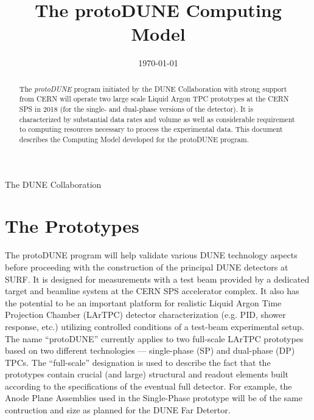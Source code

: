 \documentclass[12pt]{article}
\newcommand{\pd}{protoDUNE\xspace}
\begin{document}

\title{The \pd Computing Model}

\date{\today}

\maketitle

\centerline{The DUNE Collaboration}



\vspace{2cm}

\begin{abstract}

\noindent  The \textit{\pd} program initiated by the DUNE Collaboration with strong support from CERN
will operate two large scale Liquid Argon TPC prototypes at the CERN SPS in 2018 (for the single- and dual-phase
versions of the detector). It is characterized by substantial data rates and volume as
well as considerable requirement to computing resources necessary to process the experimental data.
This document describes the Computing Model developed for the \pd program.
\end{abstract}


\newpage
%

\newpage
\tableofcontents
\newpage
\listoftables
\newpage
\listoffigures

\newpage
\label{sec:protodune}
\section{The Prototypes}
The \pd program will help validate various DUNE technology aspects before proceeding with the construction of the principal DUNE detectors at SURF.
It is designed for measurements with a test beam provided by a dedicated target and beamline system at the CERN SPS accelerator complex.
It also has the potential to be an important platform for realistic Liquid Argon Time Projection Chamber (LArTPC) detector characterization
(e.g. PID, shower response, etc.) utilizing controlled conditions of a test-beam experimental setup. The name ``\pd'' currently applies to two
full-scale LArTPC prototypes based on two different technologies --- single-phase (SP) and dual-phase (DP) TPCs.
The ``full-scale'' designation is used to describe the fact that the prototypes
contain crucial (and large) structural and readout elements built according to the specifications
of the eventual full detector. For example, the Anode Plane Assemblies used in the Single-Phase prototype will be
of the same contruction and size as planned for the DUNE Far Detertor.
\end{document}
